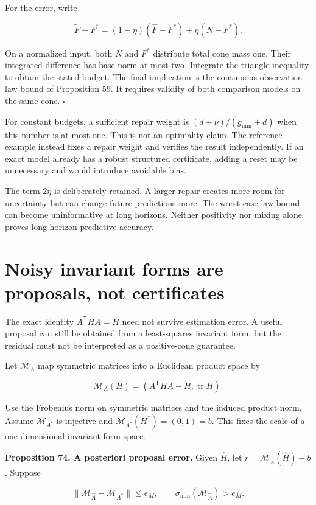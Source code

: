 For the error, write

\[
\widetilde F-F^*=(1-\eta)(\widehat F-F^*)+\eta(N-F^*).
\]

On a normalized input, both \(N\) and \(F^*\) distribute total cone mass
one. Their integrated difference has base norm at most two. Integrate
the triangle inequality to obtain the stated budget. The final
implication is the continuous observation-law bound of Proposition 59.
It requires validity of both comparison models on the same cone.
\(\square\)

For constant budgets, a sufficient repair weight is
\((d+\nu)/(g_{\min}+d)\) when this number is at most one. This is not an
optimality claim. The reference example instead fixes a repair weight
and verifies the result independently. If an exact model already has a
robust structured certificate, adding a reset may be unnecessary and
would introduce avoidable bias.

The term \(2\eta\) is deliberately retained. A larger repair creates
more room for uncertainty but can change future predictions more. The
worst-case law bound can become uninformative at long horizons. Neither
positivity nor mixing alone proves long-horizon predictive accuracy.

\section{Noisy invariant forms are proposals, not certificates}\label{LSM:noisy-invariant-forms-are-proposals-not-certificates}

The exact identity \(A^{\mathsf T}HA=H\) need not survive estimation
error. A useful proposal can still be obtained from a least-squares
invariant form, but the residual must not be interpreted as a
positive-cone guarantee.

Let \(\mathcal M_A\) map symmetric matrices into a Euclidean product
space by

\[
\mathcal M_A(H)=(A^{\mathsf T}HA-H,\operatorname{tr}H).
\]

Use the Frobenius norm on symmetric matrices and the induced product
norm. Assume \(\mathcal M_{A^*}\) is injective and
\(\mathcal M_{A^*}(H^*)=(0,1)=b\). This fixes the scale of a
one-dimensional invariant-form space.

\textbf{Proposition 74. A posteriori proposal error.} Given
\(\widehat H\), let \(r=\mathcal M_{\widehat A}(\widehat H)-b\). Suppose

\[
\|\mathcal M_{\widehat A}-\mathcal M_{A^*}\|\leq e_M,
\qquad \sigma_{\min}(\mathcal M_{\widehat A})>e_M.
\]

